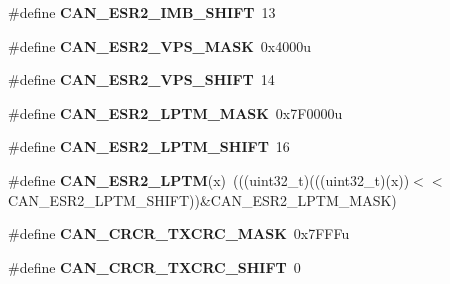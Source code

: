 \begin{DoxyCompactItemize}
\item 
\#define {\bfseries C\+A\+N\+\_\+\+E\+S\+R2\+\_\+\+I\+M\+B\+\_\+\+S\+H\+I\+FT}~13\hypertarget{group__CAN__Register__Masks_gac5b6c49733501a621096ab8226acafd0}{}\label{group__CAN__Register__Masks_gac5b6c49733501a621096ab8226acafd0}

\item 
\#define {\bfseries C\+A\+N\+\_\+\+E\+S\+R2\+\_\+\+V\+P\+S\+\_\+\+M\+A\+SK}~0x4000u\hypertarget{group__CAN__Register__Masks_ga5fc376e62f61a97583edf7a54b8753be}{}\label{group__CAN__Register__Masks_ga5fc376e62f61a97583edf7a54b8753be}

\item 
\#define {\bfseries C\+A\+N\+\_\+\+E\+S\+R2\+\_\+\+V\+P\+S\+\_\+\+S\+H\+I\+FT}~14\hypertarget{group__CAN__Register__Masks_ga7c22b4e9fdd8beae74e86b256db23665}{}\label{group__CAN__Register__Masks_ga7c22b4e9fdd8beae74e86b256db23665}

\item 
\#define {\bfseries C\+A\+N\+\_\+\+E\+S\+R2\+\_\+\+L\+P\+T\+M\+\_\+\+M\+A\+SK}~0x7\+F0000u\hypertarget{group__CAN__Register__Masks_ga864e9e1cd2a2b0e354b284bd5488f29e}{}\label{group__CAN__Register__Masks_ga864e9e1cd2a2b0e354b284bd5488f29e}

\item 
\#define {\bfseries C\+A\+N\+\_\+\+E\+S\+R2\+\_\+\+L\+P\+T\+M\+\_\+\+S\+H\+I\+FT}~16\hypertarget{group__CAN__Register__Masks_gace1651295c821917bb5b37915baa3771}{}\label{group__CAN__Register__Masks_gace1651295c821917bb5b37915baa3771}

\item 
\#define {\bfseries C\+A\+N\+\_\+\+E\+S\+R2\+\_\+\+L\+P\+TM}(x)~(((uint32\+\_\+t)(((uint32\+\_\+t)(x))$<$$<$C\+A\+N\+\_\+\+E\+S\+R2\+\_\+\+L\+P\+T\+M\+\_\+\+S\+H\+I\+FT))\&C\+A\+N\+\_\+\+E\+S\+R2\+\_\+\+L\+P\+T\+M\+\_\+\+M\+A\+SK)\hypertarget{group__CAN__Register__Masks_ga4462429a39fcbba8b4db218d8a928e88}{}\label{group__CAN__Register__Masks_ga4462429a39fcbba8b4db218d8a928e88}

\item 
\#define {\bfseries C\+A\+N\+\_\+\+C\+R\+C\+R\+\_\+\+T\+X\+C\+R\+C\+\_\+\+M\+A\+SK}~0x7\+F\+F\+Fu\hypertarget{group__CAN__Register__Masks_ga84c305cf0ec60d0624b454e280c69c4b}{}\label{group__CAN__Register__Masks_ga84c305cf0ec60d0624b454e280c69c4b}

\item 
\#define {\bfseries C\+A\+N\+\_\+\+C\+R\+C\+R\+\_\+\+T\+X\+C\+R\+C\+\_\+\+S\+H\+I\+FT}~0\hypertarget{group__CAN__Register__Masks_ga56fca714ec47e9786fdf7e9378c660aa}{}\label{group__CAN__Register__Masks_ga56fca714ec47e9786fdf7e9378c660aa}


\end{DoxyCompactItemize}
